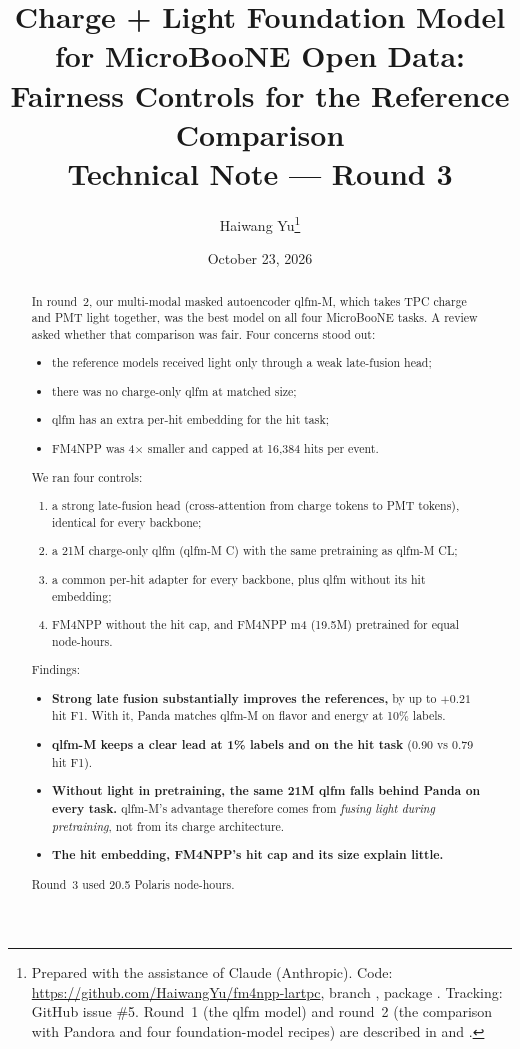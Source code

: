 \documentclass[11pt,a4paper]{article}
\title{\textbf{Charge + Light Foundation Model for MicroBooNE Open Data:\\ Fairness Controls for the Reference Comparison}\\[4pt]
\large Technical Note --- Round 3}
\author{Haiwang Yu\thanks{Prepared with the assistance of Claude (Anthropic). Code: \url{https://github.com/HaiwangYu/fm4npp-lartpc}, branch \code{main}, package \code{multi-modal-qlmatch/qlfm}. Tracking: GitHub issue \#5. Round~1 (the qlfm model) and round~2 (the comparison with Pandora and four foundation-model recipes) are described in \code{docs/technote-round1.pdf} and \code{docs/technote-round2.pdf}.}}
\date{October 23, 2026}
\begin{document}
\maketitle

\begin{abstract}
\noindent
In round~2, our multi-modal masked autoencoder qlfm-M, which takes TPC charge and PMT light together, was the best model on all four MicroBooNE tasks. A review asked whether that comparison was fair. Four concerns stood out:
\begin{itemize}
  \item the reference models received light only through a weak late-fusion head;
  \item there was no charge-only qlfm at matched size;
  \item qlfm has an extra per-hit embedding for the hit task;
  \item FM4NPP was 4$\times$ smaller and capped at 16{,}384 hits per event.
\end{itemize}

We ran four controls:
\begin{enumerate}
  \item a strong late-fusion head (cross-attention from charge tokens to PMT tokens), identical for every backbone;
  \item a 21M charge-only qlfm (qlfm-M C) with the same pretraining as qlfm-M CL;
  \item a common per-hit adapter for every backbone, plus qlfm without its hit embedding;
  \item FM4NPP without the hit cap, and FM4NPP m4 (19.5M) pretrained for equal node-hours.
\end{enumerate}

Findings:
\begin{itemize}
  \item \textbf{Strong late fusion substantially improves the references,} by up to $+0.21$ hit F1. With it, Panda matches qlfm-M on flavor and energy at 10\% labels.
  \item \textbf{qlfm-M keeps a clear lead at 1\% labels and on the hit task} (0.90 vs 0.79 hit F1).
  \item \textbf{Without light in pretraining, the same 21M qlfm falls behind Panda on every task.} qlfm-M's advantage therefore comes from \emph{fusing light during pretraining}, not from its charge architecture.
  \item \textbf{The hit embedding, FM4NPP's hit cap and its size explain little.}
\end{itemize}

Round~3 used 20.5 Polaris node-hours.
\end{abstract}
\end{document}
